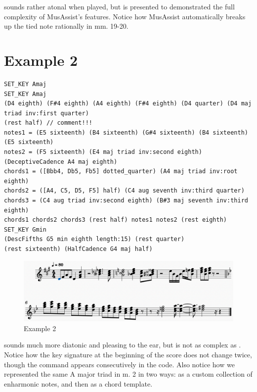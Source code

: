 \documentclass{report}
\begin{document}
\newpage

 sounds rather atonal when played, but is presented to demonstrated the full complexity of MusAssist's features. Notice how MusAssist automatically breaks up the tied note rationally in mm. 19-20.

\section{Example 2}

\begin{verbatim}
SET_KEY Amaj
SET_KEY Amaj
(D4 eighth) (F#4 eighth) (A4 eighth) (F#4 eighth) (D4 quarter) (D4 maj triad inv:first quarter) 
(rest half) // comment!!!
notes1 = (E5 sixteenth) (B4 sixteenth) (G#4 sixteenth) (B4 sixteenth) (E5 sixteenth) 
notes2 = (F5 sixteenth) (E4 maj triad inv:second eighth) (DeceptiveCadence A4 maj eighth) 
chords1 = ([Bbb4, Db5, Fb5] dotted_quarter) (A4 maj triad inv:root eighth) 
chords2 = ([A4, C5, D5, F5] half) (C4 aug seventh inv:third quarter) 
chords3 = (C4 aug triad inv:second eighth) (B#3 maj seventh inv:third eighth)
chords1 chords2 chords3 (rest half) notes1 notes2 (rest eighth)
SET_KEY Gmin
(DescFifths G5 min eighth length:15) (rest quarter)
(rest sixteenth) (HalfCadence G4 maj half)
\end{verbatim}

\begin{figure}[h!]
\centering
\includegraphics[width=\textwidth]{images/program2}
\caption{Example 2}
\label{fig:ex2}
\end{figure}

 sounds much more diatonic and pleasing to the ear, but is not as complex as . Notice how the key signature at the beginning of the score does not change twice, though the command appears consecutively in the code. Also notice how  we represented the same A major triad in m. 2 in two ways: as a custom collection of enharmonic notes, and then as a chord template.

\end{document}
